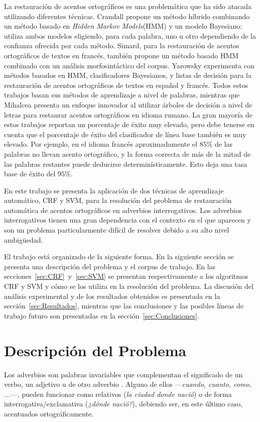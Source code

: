 \documentclass[runningheads,a4paper]{llncs}
\begin{document}
La restauración de acentos ortográficos es una problemática que ha sido atacada utilizando diferentes técnicas. Crandall\cite{CRANDALL95} propone un método híbrido combinando un método basado en \emph{Hidden Markov Models}(HMM) y un modelo Bayesiano: utiliza ambos modelos eligiendo, para cada palabra, uno u otro dependiendo de la confianza ofrecida por cada método. Simard\cite{SIMARD98}, para la restauración de acentos ortográficos de textos en francés, también propone un método basado HMM combinado con un análisis morfosintáctico del corpus. Yarowsky\cite{YAROWSKY94,YAROWSKY94-2} experimenta con métodos basados en HMM, clasificadores Bayesianos, y listas de decisión para la restauración de acentos ortográficos de textos en español y francés. Todos estos trabajos basan sus métodos de aprendizaje a nivel de palabras, mientras que Mihalcea\cite{MIHALCEA02} presenta un enfoque innovador al utilizar árboles de decisión a nivel de letras para restaurar acentos ortográficos en idioma rumano. La gran mayoría de estos trabajos reportan un porcentaje de éxito muy elevado, pero debe tenerse en cuenta que el porcentaje de éxito del clasificador de línea base también es muy elevado. Por ejemplo, en el idioma francés aproximadamente el $85\%$ de las palabras no llevan acento ortográfico, y la forma correcta de más de la mitad de las palabras restantes puede deducirse determinísticamente. Esto deja una tasa base de éxito del $95\%$\cite{SIMARD98}.

En este trabajo se presenta la aplicación de dos técnicas de aprendizaje automático, CRF y SVM, para la resolución del problema de restauración automática de acentos ortográficos en adverbios interrogativos. Los adverbios interrogativos tienen una gran dependencia con el contexto en el que aparecen y son un problema particularmente difícil de resolver debido a su alto nivel ambigüedad.

El trabajo está organizado de la siguiente forma. En la siguiente sección se presenta una descripción del problema y el corpus de trabajo. En las secciones~\ref{sec:CRF}~y~\ref{sec:SVM} se presentan respectivamente a los algoritmos  CRF y SVM y cómo se los utiliza en la resolución del problema. La discusión del análisis experimental y de los resultados obtenidos es presentada en la sección~\ref{sec:Resultados}, mientras que las conclusiones y las posibles líneas de trabajo futuro son presentadas en la sección~\ref{sec:Conclusiones}.

\section{Descripción del Problema}
Los adverbios son palabras invariables que complementan el significado de un verbo, un adjetivo u de otro adverbio \cite{RAE}. Alguno de ellos ---\emph{cuando, cuanto, como, ...}---, pueden funcionar como relativos (\emph{la ciudad donde nació}) o de forma interrogativa/exclamativa (\emph{¿dónde nació?}), debiendo ser, en este último caso,  acentuados ortográficamente. 
\end{document}
